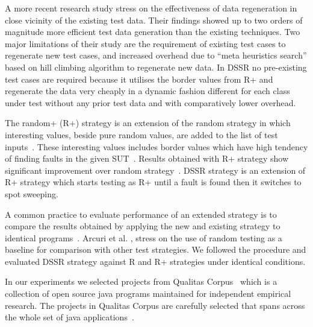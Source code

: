 \documentclass{acm_proc_article-sp}
\begin{document}
A more recent research study \cite{Yoo2012} stress on the effectiveness of data regeneration in close vicinity of the existing test data. Their findings showed up to two orders of magnitude more efficient test data generation than the existing techniques. Two major limitations of their study are the requirement of existing test cases to regenerate new test cases, and increased overhead due to ``meta heuristics search'' based on hill climbing algorithm to regenerate new data. In DSSR no pre-existing test cases are required because it utilises the border values from R+ and regenerate the data very cheaply in a dynamic fashion different for each class under test without any prior test data and with comparatively lower overhead. 
  
The random+ (R+) strategy is an extension of the random strategy in which interesting values, beside pure random values, are added to the list of test inputs~\cite{Leitner2007}. These interesting values includes border values which have high tendency of finding faults in the given SUT~\cite{Beizer1990}. Results obtained with R+ strategy show significant improvement over random strategy~\cite{Leitner2007}. DSSR strategy is an extension of R+ strategy which starts testing as R+ until a fault is found then it switches to spot sweeping.



A common practice to evaluate performance of an extended strategy is to compare the results obtained by applying the new and existing strategy to identical programs~\cite{Gutjahr1999, Duran1984, Hamlet1990}. Arcuri et al. \cite{Arcuri2012}, stress on the use of random testing as a baseline for comparison with other test strategies. We followed the procedure and evaluated DSSR strategy against R and R+ strategies under identical conditions.

In our experiments we selected projects from Qualitas Corpus~\cite{Tempero2010} which is a collection of open source java programs maintained for independent empirical research. The projects in Qualitas Corpus are carefully selected that spans across the whole set of java applications~\cite{Oriol2012, Tempero2010a, Tempero2008}.


\end{document}
